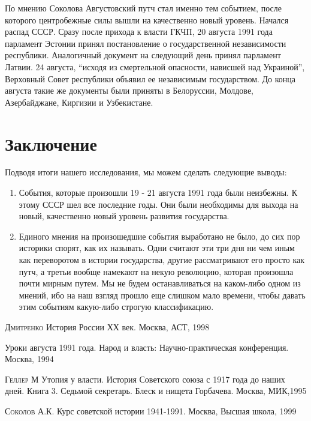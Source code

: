 \documentclass[12pt]{extarticle}
\begin{document}
По мнению Соколова\cite{4} Августовский путч стал именно тем событием, после которого центробежные силы вышли на качественно новый уровень. Начался распад СССР. Сразу после прихода к власти ГКЧП, 20 августа 1991 года парламент Эстонии принял постановление о государственной независимости республики. Аналогичный документ на следующий день принял парламент Латвии. 24 августа, “исходя из смертельной опасности, нависшей над Украиной”, Верховный Совет республики объявил ее независимым государством. До конца августа такие же документы были приняты в Белоруссии, Молдове, Азербайджане, Киргизии и Узбекистане.
\section {Заключение}

Подводя итоги нашего исследования, мы можем сделать следующие выводы:
\begin{enumerate}
	\item События, которые произошли 19 - 21 августа 1991 года были неизбежны. К этому СССР шел все последние годы. Они были необходимы для выхода на новый, качественно новый уровень развития государства.
	\item Единого мнения на произошедшие события выработано не было, до сих пор историки спорят, как их называть. Одни считают эти три дня ни чем иным как переворотом в истории государства, другие рассматривают его просто как путч, а третьи вообще намекают на некую революцию, которая произошла почти мирным путем. Мы не будем останавливаться на каком-либо одном из мнений, ибо на наш взгляд прошло еще слишком мало времени, чтобы давать этим событиям какую-либо строгую классификацию.
\end{enumerate}

\newpage
\begin{thebibliography}{99}
\textsc{Дмитренко} История России ХХ век. Москва, АСТ, 1998

\textsc{} Уроки августа 1991 года. Народ и власть: Научно-практическая конференция. Москва, 1994


\textsc{Геллер М} Утопия у власти. История Советского союза с 1917 года до наших дней. Книга 3. Седьмой секретарь. Блеск и нищета Горбачева. Москва, МИК,1995

\textsc{Соколов А.К.} Курс советской истории 1941-1991. Москва, Высшая школа, 1999




\end{thebibliography}
\end{document}
